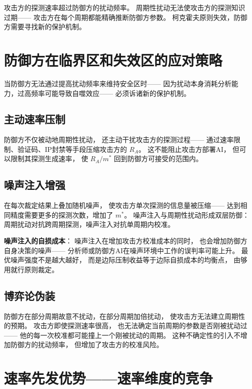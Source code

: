 \documentclass[11pt,a4paper]{article}
\begin{document}
攻击方的探测速率超过防御方的扰动频率。
周期性扰动无法使攻击方的探测知识过期——
攻击方在每个周期都能精确推断防御方参数。
柯克霍夫原则失效，防御方需要寻找新的保护机制。

\section{防御方在临界区和失效区的应对策略}

当防御方无法通过提高扰动频率来维持安全区时——
因为扰动本身消耗分析能力，过高频率可能导致自噬效应——
必须诉诸新的保护机制。

\subsection{主动速率压制}

防御方不仅被动地周期性扰动，
还主动干扰攻击方的探测过程——
通过速率限制、验证码、IP封禁等手段压缩攻击方的 \(R_A\)。
这不能阻止攻击方部署AI，
但可以限制其探测生成速率，
使 \(R_A / m^*\) 回到防御方可接受的范围内。

\subsection{噪声注入增强}

在每次裁定结果上叠加随机噪声，
使攻击方单次探测的信息量被压缩——
达到相同精度需要更多的探测次数，增加了 \(m^*\)。
噪声注入与周期性扰动形成双层防御：
周期扰动对抗跨周期探测，噪声注入对抗单周期内校准。

\textbf{噪声注入的自损成本}：
噪声注入在增加攻击方校准成本的同时，
也会增加防御方自身决策的噪声——
分析师或防御方AI在噪声环境中工作的误判率可能上升。
最优噪声强度不是越大越好，
而是边际压制收益等于边际自损成本的均衡点，
由够用就行原则裁定。

\subsection{博弈论伪装}

防御方在部分周期故意不扰动，在部分周期加倍扰动，
使攻击方无法建立周期性的预期。
攻击方即使探测速率很高，
也无法确定当前周期的参数是否刚被扰动过——
他的每一次校准都可能撞上一个刚被扰动的周期。
这种不确定性的引入不增加防御方的扰动频率，
但增加了攻击方的校准风险。

\section{速率先发优势——速率维度的竞争}
\end{document}
